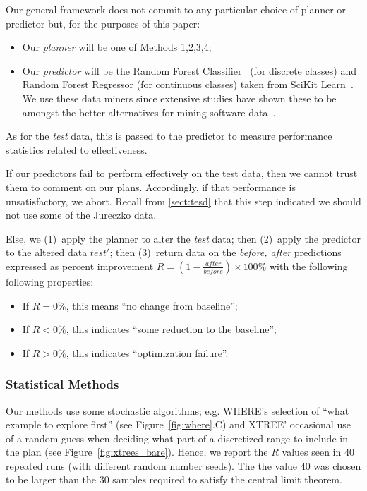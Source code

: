 \documentclass{sig-alternate}
\newcommand{\bi}{\begin{itemize}}
\newcommand{\ei}{\end{itemize}}
\newcommand{\tion}[1]{\textsection\ref{sect:#1}}
\newcommand{\fig}[1]{Figure~\ref{fig:#1}}
\begin{document}
Our general framework does not   commit to any particular choice of { planner} or { predictor} but, for the purposes of this paper:
\bi
\item Our {\em planner} will be one of Methods 1,2,3,4;
\item Our  {\em predictor} will be the Random Forest Classifier~\cite{Breiman2001} (for discrete classes) and Random Forest Regressor (for continuous classes) taken from  SciKit Learn~\cite{Pedregosa2012}.   We use these
data miners since extensive studies have shown these to be amongst the better alternatives for mining software data~\cite{lessmann}.
\ei
As for the {\em test} data, this is passed to the { predictor}
to measure performance statistics related to effectiveness. 

If our { predictors} fail to perform effectively on the test data,
then we cannot trust them to comment on our plans. Accordingly,
if that performance is unsatisfactory, we abort. Recall from \tion{tesd} that this step indicated
we should not use some of the  Jureczko data.

Else, we (1)~apply the { planner} to alter the {\em test} data;
then (2)~apply the { predictor} to the altered data $test'$;
then (3)~return data on the {\em before, after} predictions expressed as percent improvement $R=(1-\frac{\mathit{after}}{\mathit{before}})\times100\%$ with the following following properties:
\bi
\item If $R= 0\%$, this means  ``no change from baseline''; 
\item If $R < 0\%$, this indicates ``some reduction to the baseline'';
\item If $R > 0\%$, this indicates ``optimization failure''.
\ei
 \subsubsection{Statistical Methods}
 Our methods use some stochastic algorithms; e.g. WHERE's selection of ``what example to explore first'' (see \fig{where}.C) and
  XTREE' occasional use of a random guess when deciding what part of a discretized range to include in the plan
  (see \fig{xtrees_bare}). Hence, we report the $R$ values seen in 40 repeated runs
  (with different random number seeds).
The the value 40 was chosen to be  larger than the 30 samples  required
to satisfy the central limit theorem.
\end{document}
